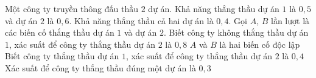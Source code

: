 	\begin{ex}%
		Một công ty truyền thông đấu thầu $2$ dự án.
		Khả năng thắng thầu dự án $1$ là $0{,}5$ và dự án $2$ là $0{,}6$.
		Khả năng thắng thầu cả hai dự án là $0{,}4$.
		Gọi $A$, $B$ lần lượt là các biến cố thắng thầu dự án $1$ và dự án $2$.
		\choiceTF
		{Biết công ty không thắng thầu dự án $1$, xác suất để công ty thắng thầu dự án $2$ là $0{,}8$}
		{$A$ và $B$ là hai biến cố độc lập}
		{Biết công ty thắng thầu dự án $1$, xác suất để công ty thắng thầu dự án $2$ là $0{,}4$}
		{\True Xác suất để công ty thắng thầu đúng một dự án là $0{,}3$}
	\end{ex}
	

